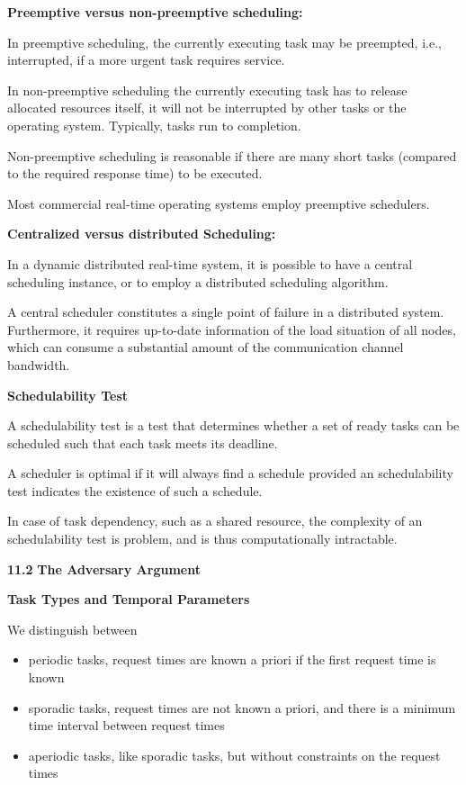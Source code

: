 \textbf{Preemptive versus non-preemptive scheduling:}

In preemptive scheduling, the currently executing task may be preempted,
i.e., interrupted, if a more urgent task requires service.

In non-preemptive scheduling the currently executing task has to release
allocated resources itself, it will not be interrupted by other tasks or
the operating system. Typically, tasks run to completion.

Non-preemptive scheduling is reasonable if there are many short tasks
(compared to the required response time) to be executed.

Most commercial real-time operating systems employ preemptive
schedulers.

\textbf{Centralized versus distributed Scheduling:}

In a dynamic distributed real-time system, it is possible to have a
central scheduling instance, or to employ a distributed scheduling
algorithm.

A central scheduler constitutes a single point of failure in a
distributed system. Furthermore, it requires up-to-date information of
the load situation of all nodes, which can consume a substantial amount
of the communication channel bandwidth.

\textbf{Schedulability Test}

A schedulability test is a test that determines whether a set of ready
tasks can be scheduled such that each task meets its deadline.

A scheduler is optimal if it will always find a schedule provided an
schedulability test indicates the existence of such a schedule.

In case of task dependency, such as a shared resource, the complexity of
an schedulability test is problem, and is thus computationally
intractable.

\textbf{11.2} \protect\hypertarget{teil3}{}{}\textbf{The Adversary
Argument }

\textbf{Task Types and Temporal Parameters}

We distinguish between

\begin{itemize}
\item
  periodic tasks, request times are known a priori if the first request
  time is known
\item
  sporadic tasks, request times are not known a priori, and there is a
  minimum time interval between request times
\item
  aperiodic tasks, like sporadic tasks, but without constraints on the
  request times
\end{itemize}

